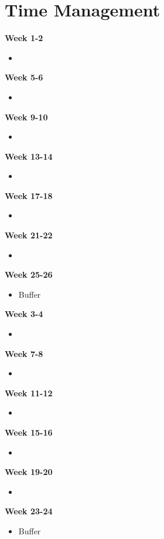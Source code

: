 \documentclass[a4paper,11pt]{article}
\begin{document}
\section{Time Management}
\begin{minipage}[t]{.45\textwidth}
    \textbf{Week 1-2}
    \begin{itemize}
        \item 
    \end{itemize}
    \textbf{Week 5-6}
    \begin{itemize}
        \item 
    \end{itemize}
    \textbf{Week 9-10}
    \begin{itemize}
        \item 
    \end{itemize}
    \textbf{Week 13-14}
    \begin{itemize}
        \item 
    \end{itemize}
    \textbf{Week 17-18}
    \begin{itemize}
        \item 
    \end{itemize}
    \textbf{Week 21-22}
    \begin{itemize}
        \item 
    \end{itemize}
    \textbf{Week 25-26}
    \begin{itemize}
        \item Buffer
    \end{itemize}
\end{minipage}
\hfill
\begin{minipage}[t]{.45\textwidth}
    \textbf{Week 3-4}
    \begin{itemize}
        \item 
    \end{itemize}
    \textbf{Week 7-8}
    \begin{itemize}
        \item 
    \end{itemize}
    \textbf{Week 11-12}
    \begin{itemize}
        \item 
    \end{itemize}
    \textbf{Week 15-16}
    \begin{itemize}
        \item 
    \end{itemize}
    \textbf{Week 19-20}
    \begin{itemize}
        \item 
    \end{itemize}
    \textbf{Week 23-24}
    \begin{itemize}
        \item Buffer
    \end{itemize}
\end{minipage}
\end{document}

